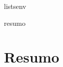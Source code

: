 
\newcommand{\makeepigraph}{
\begin{emptyenv}
        \vspace*{\fill}
        \epigraph{\emph{\Wepigraphtext}}{\Wepigraphauthor}
\end{emptyenv}
}



\newenvironment{emptyenv}
{
    \clearpage
    \thispagestyle{empty}
}

\newenvironment{listsenv}
{   
    \cleardoublepage
    \pagestyle{empty}
    \titleformat{\chapter}{\filcenter}{}{0pt}{\normalfont\fontsize{15}{15}\bfseries}
}{
    \cleardoublepage
    \pagestyle{numbered}

}

\newenvironment{bibenv}
{
    \clearpage
    \titleformat{\chapter}{\filcenter}{}{0pt}{\normalfont\fontsize{15}{15}\bfseries}
}

    
\newenvironment{resumo}
{
    \clearpage
    \titleformat{\chapter}{\filcenter}{}{0pt}{\normalfont\fontsize{15}{15}\bfseries}
    \chapter*{Resumo}
    
    \vspace*{0.75cm}
    \thispagestyle{empty}
}

